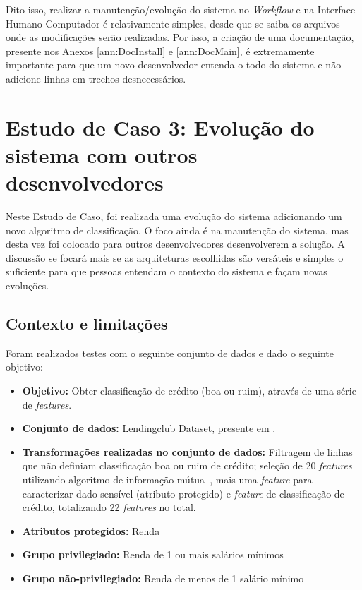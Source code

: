 \documentclass[portugues]{ic-tese}
\begin{document}
Dito isso, realizar a manutenção/evolução do sistema no \textit{Workflow} e na Interface Humano-Computador é relativamente simples, desde que se saiba os arquivos onde as modificações serão realizadas. Por isso, a criação de uma documentação, presente nos Anexos \ref{ann:DocInstall} e \ref{ann:DocMain}, é extremamente importante para que um novo desenvolvedor entenda o todo do sistema e não adicione linhas em trechos desnecessários.

\chapter{Estudo de Caso 3: Evolução do sistema com outros desenvolvedores}

Neste Estudo de Caso, foi realizada uma evolução do sistema adicionando um novo algoritmo de classificação. O foco ainda é na manutenção do sistema, mas desta vez foi colocado para outros desenvolvedores desenvolverem a solução. A discussão se focará mais se as arquiteturas escolhidas são versáteis e simples o suficiente para que pessoas entendam o contexto do sistema e façam novas evoluções.

\section{Contexto e limitações}

Foram realizados testes com o seguinte conjunto de dados e dado o seguinte objetivo:

\begin{itemize}
\item \textbf{Objetivo:} Obter classificação de crédito (boa ou ruim), através de uma série de \textit{features}.

\item \textbf{Conjunto de dados:} Lendingclub Dataset, presente em \citep{lendingclub_2022}.

\item \textbf{Transformações realizadas no conjunto de dados:} Filtragem de linhas que não definiam classificação boa ou ruim de crédito; seleção de 20 \textit{features} utilizando algoritmo de informação mútua~\citep{Ross_2014}, mais uma \textit{feature} para caracterizar dado sensível (atributo protegido) e \textit{feature} de classificação de crédito, totalizando 22 \textit{features} no total.

\item \textbf{Atributos protegidos:} Renda

\item \textbf{Grupo privilegiado:} Renda de 1 ou mais salários mínimos

\item \textbf{Grupo não-privilegiado:} Renda de menos de 1 salário mínimo

\end{itemize}
\end{document}
